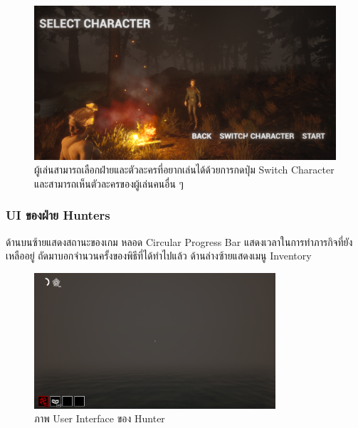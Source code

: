 \begin{figure}[h!]
  \begin{center}
  \includegraphics[width=\textwidth]{./img/UI/select_character.png}
  \end{center}
  \caption[หน้าเลือกตัวละครหลังจากเข้าร่วมห้องแล้ว]{ผู้เล่นสามารถเลือกฝ่ายและตัวละครที่อยากเล่นได้ด้วยการกดปุ่ม Switch Character และสามารถเห็นตัวละครของผู้เล่นคนอื่น ๆ}
  \label{ผู้เล่นสามารถเลือกฝ่ายและตัวละครที่อยากเล่นได้ด้วยการกดปุ่ม Switch Character และสามารถเห็นตัวละครของผู้เล่นคนอื่น ๆ}
\end{figure}

\subsubsection{UI ของฝ่าย Hunters}

ด้านบนซ้ายแสดงสถานะของเกม หลอด Circular Progress Bar แสดงเวลาในการทำภารกิจที่ยังเหลืออยู่ ถัดมาบอกจำนวนครั้งของพิธีที่ได้ทำไปแล้ว
ด้านล่างซ้ายแสดงเมนู Inventory

\begin{figure}[h]
  \begin{center}
  \includegraphics[width=0.8\textwidth]{./img/UI/hunter_ui.png}
  \end{center}
  \caption[ภาพ User Interface ของ Hunter]{ภาพ User Interface ของ Hunter}
  \label{ภาพ User Interface ของ Hunter}
\end{figure}

